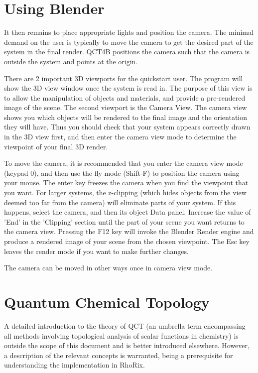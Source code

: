 \documentclass{tufte-book}
\newcommand{\programName}{RhoRix}
\begin{document}
\chapter{Using Blender}

It then remains to place appropriate lights and position the camera.
The minimal demand on the user is typically to move the camera to get the desired part of the system in the final 
render.
QCT4B positions the camera such that the camera is outside the system and points at the origin.

There are 2 important 3D viewports for the quickstart user. The program will show the 3D view window once the 
system is read in.
The purpose of this view is to allow the manipulation of objects and materials, and provide a pre-rendered image 
of the scene.
The second viewport is the Camera View. The camera view shows you which objects will be rendered to the final image 
and the orientation they will have.
Thus you should check that your system appears correctly drawn in the 3D view first, and then enter the camera 
view mode to determine the viewpoint of your final 3D render.

To move the camera, it is recommended that you enter the camera view mode (keypad 0), and then use the fly mode 
(Shift-F) to position the camera using your mouse.
The enter key freezes the camera when you find the viewpoint that you want.
For larger systems, the z-clipping (which hides objects from the view deemed too far from the camera) will 
eliminate parts of your system.
If this happens, select the camera, and then its object Data panel.
Increase the value of 'End' in the 'Clipping' section until the part of your scene you want returns to the camera view.
Pressing the F12 key will invoke the Blender Render engine and produce a rendered image of your scene from the 
chosen viewpoint.
The Esc key leaves the render mode if you want to make further changes.

The camera can be moved in other ways once in camera view mode.

\chapter{Quantum Chemical Topology}

A detailed introduction to the theory of QCT (an umbrella term encompassing all methods involving topological 
analysis of scalar functions in chemistry) is outside the scope of this document and is better introduced elsewhere.
However, a description of the relevant concepts is warranted, being a prerequisite for understanding the implementation in \programName{}.
\end{document}
